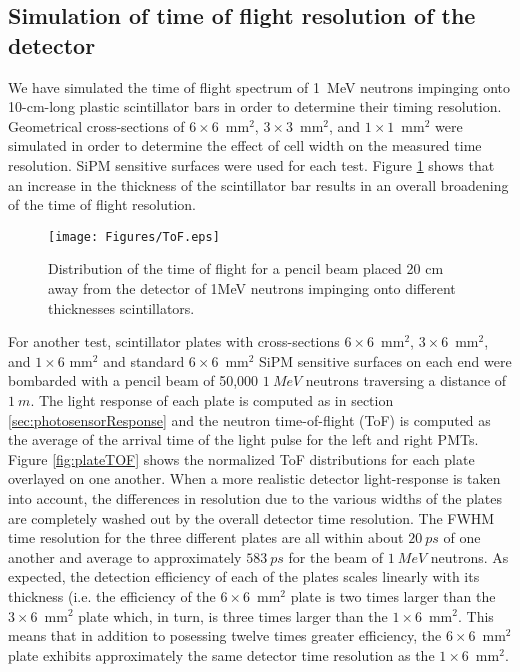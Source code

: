 \subsection{Simulation of time of flight resolution of the detector}

We have simulated the time of flight spectrum of 1~MeV neutrons impinging onto 10-cm-long plastic scintillator bars in order to determine their timing resolution. Geometrical cross-sections of $6 \times 6$~mm$^{2}$, $3 \times 3$~mm$^{2}$, and $1 \times 1$~mm$^{2}$ were simulated in order to determine the effect of cell width on the measured time resolution. SiPM sensitive surfaces were used for each test. Figure \ref{fig:ToF} shows that an increase in the thickness of the scintillator bar results in an overall broadening of the time of flight resolution.

\begin{figure}[tb]
\centering
\texttt{[image: Figures/ToF.eps]}
\caption{Distribution of the time of flight for a pencil beam  placed 20 cm away from the detector of 1MeV  neutrons impinging onto different thicknesses scintillators.}
\label{fig:ToF}
\end{figure}

For another test, scintillator plates with cross-sections $6 \times 6$~mm$^{2}$, $3 \times 6$~mm$^{2}$, and $1 \times 6$ mm$^{2}$ and standard $6 \times 6$~mm$^{2}$ SiPM sensitive surfaces on each end were bombarded with a pencil beam of 50,000 $1~MeV$ neutrons traversing a distance of $1~m$. The light response of each plate is computed as in section \ref{sec:photosensorResponse} and the neutron time-of-flight (ToF) is computed as the average of the arrival time of the light pulse for the left and right PMTs. Figure \ref{fig:plateTOF} shows the normalized ToF distributions for each plate overlayed on one another. When a more realistic detector light-response is taken into account, the differences in resolution due to the various widths of the plates are completely washed out by the overall detector time resolution. The FWHM time resolution for the three different plates are all within about $20~ps$ of one another and average to approximately $583~ps$ for the beam of $1~MeV$ neutrons. As expected, the detection efficiency of each of the plates scales linearly with its thickness (i.e. the efficiency of the $6 \times 6$~mm$^2$ plate is two times larger than the $3 \times 6$~mm$^2$ plate which, in turn, is three times larger than the $1 \times 6$~mm$^2$. This means that in addition to posessing twelve times greater efficiency, the $6 \times 6$~mm$^2$ plate exhibits approximately the same detector time resolution as the $1 \times 6$~mm$^2$.  

